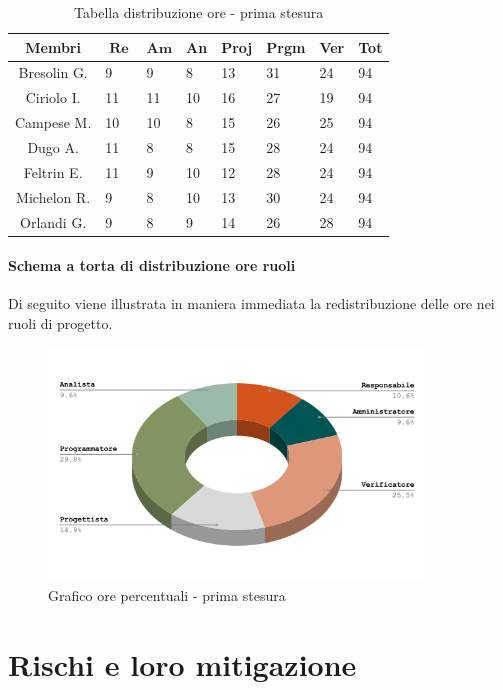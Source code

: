 \documentclass[10pt, a4paper]{article}
\begin{document}
{\renewcommand{\arraystretch}{1.2}
\begin{table}[H]
\begin{tabularx}{\textwidth}{c|X|X|X|X|X|X|X}
        \textbf{Membri} & $\operatorname{\textbf{Re}}$ & $\mathrm{\textbf{Am}}$ & \textbf{An} & \textbf{Proj} & \textbf{Prgm} & \textbf{Ver} & \textbf{Tot} \\
        \hline Bresolin G. & 9 & 9 & 8 & 13 & 31 & 24 & 94 \\
        \hline Ciriolo I. & 11 & 11 & 10 & 16 & 27 & 19 & 94 \\
        \hline Campese M. & 10 & 10 & 8 & 15 & 26 & 25 & 94 \\
        \hline Dugo A. & 11 & 8 & 8 & 15 & 28 & 24 & 94 \\
        \hline Feltrin E. & 11 & 9 & 10 & 12 & 28 & 24 & 94 \\
        \hline Michelon R. & 9 & 8 & 10 & 13 & 30 & 24 & 94 \\
        \hline Orlandi G. & 9 & 8 & 9 & 14 & 26 & 28 & 94 
    \end{tabularx}
    \caption{Tabella distribuzione ore - prima stesura}
    \end{table}
\paragraph{Schema a torta di distribuzione ore ruoli} Di seguito viene illustrata in maniera immediata la redistribuzione delle ore nei ruoli di progetto.
    \begin{figure}[!h]
        \centering
        \includegraphics[width=10cm]{torta.png}
        \caption{Grafico ore percentuali - prima stesura}
        
    \end{figure}


\section{Rischi e loro mitigazione}
\label{section:Rischi}
}
\end{document}
